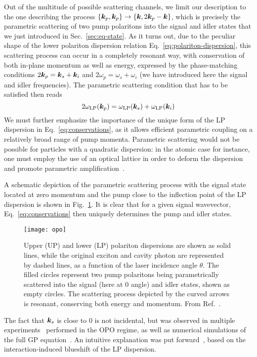 Out of the multitude of possible scattering channels, we limit our
description to the one describing the process
$\{\bm{k}_p, \bm{k}_p\} \rightarrow \{\bm{k}, 2\bm{k}_p - \bm{k}\}$, which is
precisely the parametric scattering of two pump polaritons into the
signal and idler states that we just introduced in
Sec.~\ref{sec:eq-state}. As it turns out, due to the peculiar shape
of the lower polariton dispersion relation
Eq.~\eqref{eq:polariton-dispersion}, this scattering process can occur
in a completely resonant way, with conservation of both in-plane
momentum as well as energy, expressed by the phase-matching conditions
$2\bm{k}_p = \bm{k}_s + \bm{k}_i$ and $2\omega_p = \omega_s + \omega_i$ (we
have introduced here the signal and idler frequencies). The parametric
scattering condition that has to be satisfied then reads
%
\begin{equation}\label{eq:conservations}
  2\omega_{\text{LP}}(\bm{k}_p) =   \omega_{\text{LP}}(\bm{k}_s) +   \omega_{\text{LP}}(\bm{k}_i)
\end{equation}
% 
We must further emphasize the importance of the unique form of the LP
dispersion in Eq.~\eqref{eq:conservations}, as it allows efficient
parametric coupling on a relatively broad range of pump momenta.
Parametric scattering would not be possible for particles with a
quadratic dispersion: in the atomic case for instance, one must employ
the use of an optical lattice in order to deform the dispersion and
promote parametric amplification~\cite{Campbell2006}. 

A schematic depiction of the parametric scattering process with the
signal state located at zero momentum and the pump close to the
inflection point of the LP dispersion is shown in
Fig.~\ref{fig:parametric-scattering}. It is clear that for a given
signal wavevector, Eq.~\eqref{eq:conservations} then uniquely determines
the pump and idler states.
%
\begin{figure}[tb]\centering
  \texttt{[image: opo]}
  \caption{
    Upper (UP) and lower (LP) polariton dispersions are shown as solid lines, while the original exciton and cavity photon are represented by dashed lines, as a function of the laser incidence angle $\theta$. The filled circles represent two pump polaritons being parametrically scattered into the signal (here at 0 angle) and idler states, shown as empty circles. The scattering process depicted by the curved arrows is resonant, conserving both energy and momentum. From Ref.~\cite{Ciuti_2003}.
  }\label{fig:parametric-scattering}
\end{figure}
%
The fact that $\bm{k}_s$ is close to $0$ is not incidental, but was
observed in multiple experiments~\cite{Stevenson2000,Baumberg2000}
performed in the OPO regime, as well as numerical simulations of the
full GP equation~\cite{9783642241857}. An intuitive explanation was
put forward~\cite{Gippius2004,Whittaker_2005}, based on the
interaction-induced blueshift of the LP dispersion.

